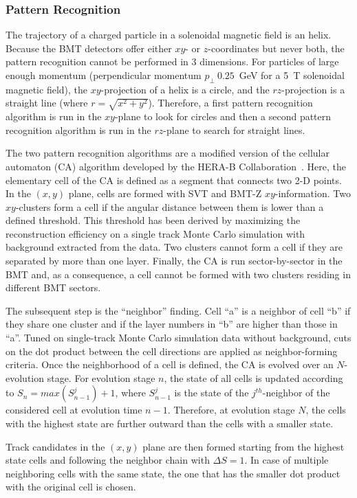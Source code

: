\subsubsection{Pattern Recognition}

The trajectory of a charged particle in a solenoidal magnetic field is an helix. Because the BMT detectors offer
either $xy$- or $z$-coordinates but never both, the pattern recognition cannot be performed in 3 dimensions. For
particles of large enough momentum (perpendicular momentum $p_\perp \> 0.25$~GeV for a 5~T solenoidal magnetic
field), the $xy$-projection of a helix is a circle, and the $rz$-projection is a straight line (where
$r = \sqrt{x^2 + y^2}$). Therefore, a first pattern recognition algorithm is run in the $xy$-plane to look for circles
and then a second pattern recognition algorithm is run in the $rz$-plane to search for straight lines.

The two pattern recognition algorithms are a modified version of the cellular automaton (CA) algorithm developed
by the HERA-B Collaboration~\cite{CA-HeraB}. Here, the elementary cell of the CA is defined as a segment that
connects two 2-D points. In the $(x,y)$ plane, cells are formed with SVT and BMT-Z $xy$-information. Two
$xy$-clusters form a cell if the angular distance between them is lower than a defined threshold. This threshold
has been derived by maximizing the reconstruction efficiency on a single track Monte Carlo simulation with
background extracted from the data. Two clusters cannot form a cell if they are separated by more than one layer.
Finally, the CA is run sector-by-sector in the BMT and, as a consequence, a cell cannot be formed with two clusters
residing in different BMT sectors.

The subsequent step is the ``neighbor'' finding. Cell ``a'' is a neighbor of cell ``b'' if they share one cluster and
if the layer numbers in ``b'' are higher than those in ``a''. Tuned on single-track Monte Carlo simulation data
without background, cuts on the dot product between the cell directions are applied as neighbor-forming criteria.
Once the neighborhood of a cell is defined, the CA is evolved over an $N$-evolution stage. For evolution stage $n$,
the state of all cells is updated according to $S_n = max(S_{n-1}^j) + 1$, where $S_{n-1}^j$ is the state of the
$j^{th}$-neighbor of the considered cell at evolution time $n-1$. Therefore, at evolution stage $N$, the cells with
the highest state are further outward than the cells with a smaller state. 

Track candidates in the $(x,y)$ plane are then formed starting from the highest state cells and following the
neighbor chain with $\Delta S = 1$. In case of multiple neighboring cells with the same state, the one that has
the smaller dot product with the original cell is chosen.

